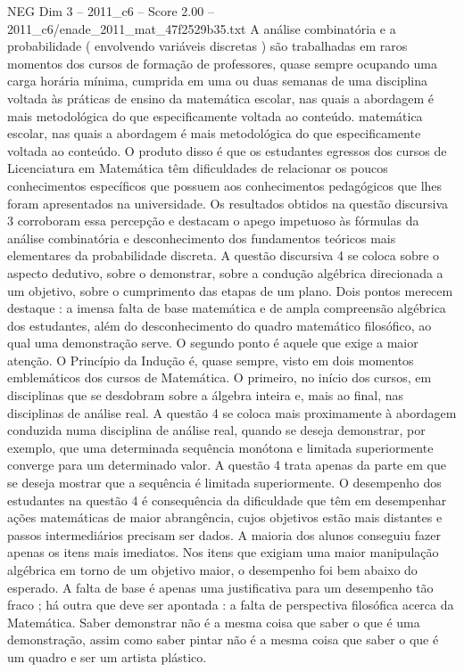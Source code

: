 \begin{textsample}{NEG Dim 3 – 2011\_c6 – Score 2.00 – 2011\_c6/enade\_2011\_mat\_47f2529b35.txt}
A análise combinatória e a probabilidade ( envolvendo variáveis discretas ) são trabalhadas em raros momentos dos cursos de formação de professores, quase sempre ocupando uma carga horária mínima, cumprida em uma ou duas semanas de uma disciplina voltada às práticas de ensino da matemática escolar, nas quais a abordagem é mais metodológica do que especificamente voltada ao conteúdo. matemática escolar, nas quais a abordagem é mais metodológica do que especificamente voltada ao conteúdo.
O produto disso é que os estudantes egressos dos cursos de Licenciatura em Matemática têm dificuldades de relacionar os poucos conhecimentos específicos que possuem aos conhecimentos pedagógicos que lhes foram apresentados na universidade.
Os resultados obtidos na questão discursiva 3 corroboram essa percepção e destacam o apego impetuoso às fórmulas da análise combinatória e desconhecimento dos fundamentos teóricos mais elementares da probabilidade discreta.
A questão discursiva 4 se coloca sobre o aspecto dedutivo, sobre o demonstrar, sobre a condução algébrica direcionada a um objetivo, sobre o cumprimento das etapas de um plano.
Dois pontos merecem destaque : a imensa falta de base matemática e de ampla compreensão algébrica dos estudantes, além do desconhecimento do quadro matemático filosófico, ao qual uma demonstração serve.
O segundo ponto é aquele que exige a maior atenção.
O Princípio da Indução é, quase sempre, visto em dois momentos emblemáticos dos cursos de Matemática.
O primeiro, no início dos cursos, em disciplinas que se desdobram sobre a álgebra inteira e, mais ao final, nas disciplinas de análise real.
A questão 4 se coloca mais proximamente à abordagem conduzida numa disciplina de análise real, quando se deseja demonstrar, por exemplo, que uma determinada sequência monótona e limitada superiormente converge para um determinado valor.
A questão 4 trata apenas da parte em que se deseja mostrar que a sequência é limitada superiormente.
O desempenho dos estudantes na questão 4 é consequência da dificuldade que têm em desempenhar ações matemáticas de maior abrangência, cujos objetivos estão mais distantes e passos intermediários precisam ser dados.
A maioria dos alunos conseguiu fazer apenas os itens mais imediatos.
Nos itens que exigiam uma maior manipulação algébrica em torno de um objetivo maior, o desempenho foi bem abaixo do esperado.
A falta de base é apenas uma justificativa para um desempenho tão fraco ; há outra que deve ser apontada : a falta de perspectiva filosófica acerca da Matemática.
Saber demonstrar não é a mesma coisa que saber o que é uma demonstração, assim como saber pintar não é a mesma coisa que saber o que é um quadro e ser um artista plástico.

\end{textsample}

